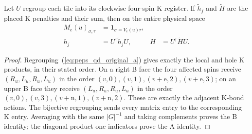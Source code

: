 \begin{theorem}
    \label{thm:peps_qd_original_blocking}

    Let $U$ regroup each tile into its clockwise four-spin K register.
    If $\widetilde h_j$ and $\widetilde H$ are the placed K penalties and
    their sum, then on the entire physical space
    \begin{align}
        M_e(u)_{\sigma,\tau}
          &=\mathbf1_{\sigma=V_e(u)\tau},\\
        h_j&=U^\dagger\widetilde h_jU,&
        H&=U^\dagger\widetilde HU.
        \label{eq:peps_qd_original_blocking}
    \end{align}
\end{theorem}
\begin{proof}
    Regrouping~(\ref{eq:peps_qd_original_a}) gives exactly the local and
    hole K products, in their stated order. On a right B face the four
    affected spins receive $(R_u,L_u,R_u,L_u)$ in the order
    $(v,0),(v,1),(v+\mathrm e,2),(v+\mathrm e,3)$; on an upper B face
    they receive $(L_u,R_u,R_u,L_u)$ in the order
    $(v,0),(v,3),(v+\mathrm n,1),(v+\mathrm n,2)$.
    These are exactly the adjacent K-bond actions.
    The bijective regrouping sends every matrix entry to the corresponding
    K entry. Averaging with the same $|G|^{-1}$ and taking complements proves
    the B identity; the diagonal product-one indicators prove the A identity.
\end{proof}

